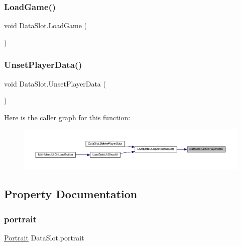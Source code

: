 \subsubsection{\texorpdfstring{LoadGame()}{LoadGame()}}
{\footnotesize\ttfamily void Data\+Slot.\+Load\+Game (\begin{DoxyParamCaption}{ }\end{DoxyParamCaption})}

\mbox{\label{class_data_slot_a2d8c55c9436701f7d2a12ab7388dcdec}} 
\subsubsection{\texorpdfstring{UnsetPlayerData()}{UnsetPlayerData()}}
{\footnotesize\ttfamily void Data\+Slot.\+Unset\+Player\+Data (\begin{DoxyParamCaption}{ }\end{DoxyParamCaption})}

Here is the caller graph for this function\+:\nopagebreak
\begin{figure}[H]
\begin{center}
\leavevmode
\includegraphics[width=350pt]{class_data_slot_a2d8c55c9436701f7d2a12ab7388dcdec_icgraph}
\end{center}
\end{figure}


\subsection{Property Documentation}
\mbox{\label{class_data_slot_abe2454953aa5b018407db6ebbdc18083}} 
\subsubsection{\texorpdfstring{portrait}{portrait}}
{\footnotesize\ttfamily \mbox{\hyperlink{class_portrait}{Portrait}} Data\+Slot.\+portrait\hspace{0.3cm}{\ttfamily [get]}}

